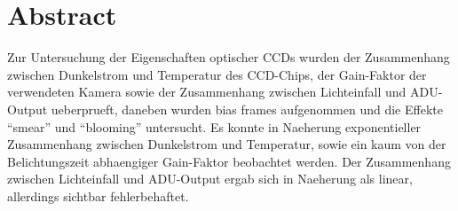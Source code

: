 \section{Abstract}
Zur Untersuchung der Eigenschaften optischer CCDs wurden der Zusammenhang zwischen Dunkelstrom und Temperatur des CCD-Chips, der Gain-Faktor der verwendeten Kamera sowie der Zusammenhang zwischen Lichteinfall und ADU-Output ueberprueft, daneben wurden bias frames aufgenommen und die Effekte \enquote{smear} und \enquote{blooming} untersucht. Es konnte in Naeherung exponentieller Zusammenhang zwischen Dunkelstrom und Temperatur, sowie ein kaum von der Belichtungszeit abhaengiger Gain-Faktor beobachtet werden. Der Zusammenhang zwischen Lichteinfall und ADU-Output ergab sich in Naeherung als linear, allerdings sichtbar fehlerbehaftet. 
